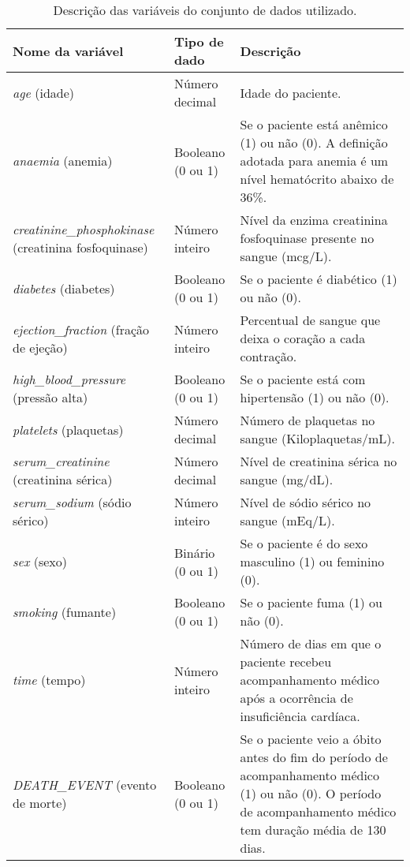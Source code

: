 \begin{table}[ht!]
  \begin{center}
  \setlength{\belowcaptionskip}{10pt}
  \footnotesize {
    \begin{tabular}{|p{4cm}|p{2.5cm}|p{8.5cm}|}
	  \hline
	  \textbf{Nome da variável} & \textbf{Tipo de dado} & \textbf{Descrição} \\
	  \hline
    \textit{age} (idade) & Número decimal & Idade do paciente. \\
    \hline
    \textit{anaemia} (anemia) & Booleano (0 ou 1) & Se o paciente está anêmico (1) ou não (0). A definição adotada para anemia é um nível hematócrito abaixo de 36\%. \\
    \hline
    \textit{creatinine\_phosphokinase} \newline (creatinina fosfoquinase) & Número inteiro & Nível da enzima creatinina fosfoquinase presente no sangue (mcg/L). \\
    \hline
    \textit{diabetes} (diabetes) & Booleano (0 ou 1) & Se o paciente é diabético (1) ou não (0). \\
    \hline
    \textit{ejection\_fraction} \newline (fração de ejeção) & Número inteiro & Percentual de sangue que deixa o coração a cada contração. \\
    \hline
    \textit{high\_blood\_pressure} \newline (pressão alta) & Booleano (0 ou 1) & Se o paciente está com hipertensão (1) ou não (0). \\
    \hline
    \textit{platelets} (plaquetas) & Número decimal & Número de plaquetas no sangue (Kiloplaquetas/mL). \\
    \hline
    \textit{serum\_creatinine} \newline (creatinina sérica) & Número decimal & Nível de creatinina sérica no sangue (mg/dL). \\
    \hline
    \textit{serum\_sodium} \newline (sódio sérico) & Número inteiro & Nível de sódio sérico no sangue (mEq/L). \\
    \hline
    \textit{sex} (sexo) & Binário (0 ou 1) & Se o paciente é do sexo masculino (1) ou feminino (0). \\
    \hline
    \textit{smoking} (fumante) & Booleano (0 ou 1) & Se o paciente fuma (1) ou não (0). \\
    \hline
    \textit{time} (tempo) & Número inteiro & Número de dias em que o paciente recebeu acompanhamento médico após a ocorrência de insuficiência cardíaca. \\
    \hline
    \textit{DEATH\_EVENT} \newline (evento de morte) & Booleano (0 ou 1) & Se o paciente veio a óbito antes do fim do período de acompanhamento médico (1) ou não (0). O período de acompanhamento médico tem duração média de 130 dias. \\
    \hline
    \end{tabular}
  }
  \caption{Descrição das variáveis do conjunto de dados utilizado.}
  \label{table:descricao_conjunto_de_dados}
  \end{center}
\end{table}

